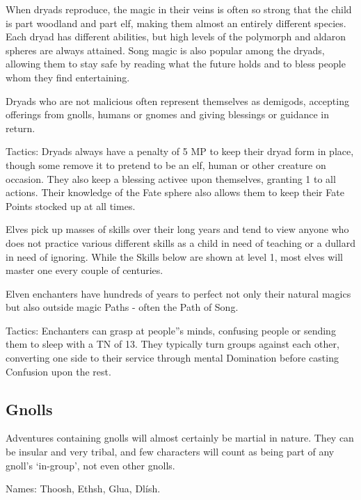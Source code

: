 \begin{multicols}{2}
When dryads reproduce, the magic in their veins is often so strong that the child is part woodland and part elf, making them almost an entirely different species.  Each dryad has different abilities, but high levels of the polymorph and aldaron spheres are always attained.  Song magic is also popular among the dryads, allowing them to stay safe by reading what the future holds and to bless people whom they find entertaining.

Dryads who are not malicious often represent themselves as demigods, accepting offerings from gnolls, humans or gnomes and giving blessings or guidance in return.

Tactics: Dryads always have a penalty of 5 MP to keep their dryad form in place, though some remove it to pretend to be an elf, human or other creature on occasion.  They also keep a blessing activee upon themselves, granting 1 to all actions.  Their knowledge of the Fate sphere also allows them to keep their Fate Points stocked up at all times.

\label{elf}
\elf

Elves pick up masses of skills over their long years and tend to view anyone who does not practice various different skills as a child in need of teaching or a dullard in need of ignoring.  While the Skills below are shown at level 1, most elves will master one every couple of centuries.

\label{elven_enchanter}

\elvenenchanter

Elven enchanters have hundreds of years to perfect not only their natural magics but also outside magic Paths - often the Path of Song.

	Tactics: Enchanters can grasp at people''s minds, confusing people or sending them to sleep with a TN of 13.  They typically turn groups against each other, converting one side to their service through mental Domination before casting Confusion upon the rest.

\subsection{Gnolls}

Adventures containing gnolls will almost certainly be martial in nature.  They can be insular and very tribal, and few characters will count as being part of any gnoll's `in-group', not even other gnolls.

	Names: Thoosh, Ethsh, Glua, Dl\'{i}sh.


\end{multicols}
